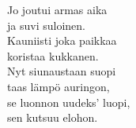 
Jo joutui armas aika \\ ja suvi suloinen. \\ Kauniisti joka paikkaa \\ koristaa kukkanen. \\ Nyt siunaustaan suopi \\ taas lämpö auringon, \\ se luonnon uudeks' luopi, \\ sen kutsuu elohon.